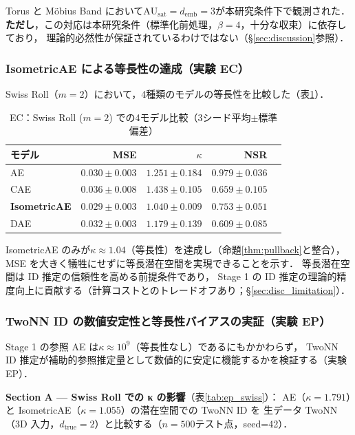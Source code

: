 \documentclass[11pt,a4paper]{jsarticle}
\newcommand{\kap}{\kappa}
\newcommand{\AUsat}{\mathrm{AU}_{\mathrm{sat}}}
\newcommand{\demb}{d_{\mathrm{emb}}}
\begin{document}
Torus と Möbius Band において$\AUsat = \demb = 3$が本研究条件下で観測された．
\textbf{ただし}，この対応は本研究条件（標準化前処理，$\beta = 4$，十分な収束）に依存しており，
理論的必然性が保証されているわけではない（§\ref{sec:discussion}参照）．

\subsubsection{IsometricAE による等長性の達成（実験 EC）}

Swiss Roll（$m = 2$）において，4種類のモデルの等長性を比較した（表\ref{tab:ec}）．

\begin{table}[H]
\centering
\caption{EC：Swiss Roll ($m=2$) での4モデル比較（3シード平均$\pm$標準偏差）}
\label{tab:ec}
\small
\begin{tabular}{lrrrr}
\toprule
モデル & MSE & $\kap$ & NSR \\
\midrule
AE & $0.030\pm0.003$ & $1.251\pm0.184$ & $0.979\pm0.036$ \\
CAE & $0.036\pm0.008$ & $1.438\pm0.105$ & $0.659\pm0.105$ \\
\textbf{IsometricAE} & $\boldsymbol{0.029\pm0.003}$ & $\boldsymbol{1.040\pm0.009}$ & $0.753\pm0.051$ \\
DAE & $0.032\pm0.003$ & $1.179\pm0.139$ & $0.609\pm0.085$ \\
\bottomrule
\end{tabular}
\end{table}

IsometricAE のみが$\kap \approx 1.04$（等長性）を達成し（命題\ref{thm:pullback}と整合），
MSE を大きく犠牲にせずに等長潜在空間を実現できることを示す．
等長潜在空間は ID 推定の信頼性を高める前提条件であり，
Stage 1 の ID 推定の理論的精度向上に貢献する（計算コストとのトレードオフあり；§\ref{sec:disc_limitation}）．

\subsubsection{TwoNN ID の数値安定性と等長性バイアスの実証（実験 EP）}\label{sec:exp_ep}

Stage 1 の参照 AE は$\kap \approx 10^9$（等長性なし）であるにもかかわらず，
TwoNN ID 推定が補助的参照推定量として数値的に安定に機能するかを検証する（実験 EP）．

\textbf{Section A — Swiss Roll での κ の影響}（表\ref{tab:ep_swiss}）：
AE（$\kap = 1.791$）と IsometricAE（$\kap = 1.055$）の潜在空間での TwoNN ID を
生データ TwoNN（3D 入力，$d_\mathrm{true}=2$）と比較する（$n=500$テスト点，seed=42）．
\end{document}
